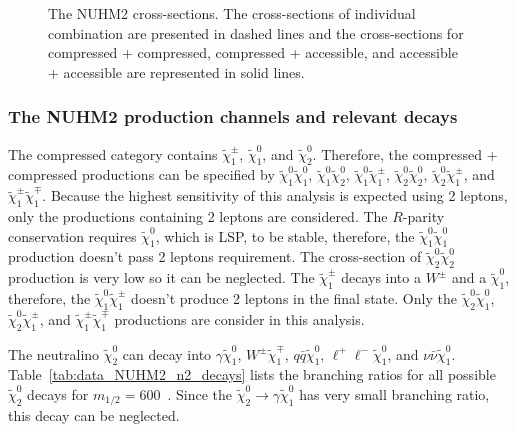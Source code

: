 \begin{figure}[htbp]
    \begin{center}
        \caption{The NUHM2 cross-sections.
        The cross-sections of individual combination are presented in dashed lines and the cross-sections for compressed + compressed, compressed + accessible, and accessible + accessible are represented in solid lines.}
        \label{fig:data_NUHM2_cross_sections}
    \end{center}
\end{figure}


\subsubsection{The NUHM2 production channels and relevant decays}
\label{subsubsec:data_channels_and_decays}
The compressed category contains $\widetilde{\chi}^{\pm}_{1}$, $\widetilde{\chi}^{0}_{1}$, and $\widetilde{\chi}^{0}_{2}$.
Therefore, the compressed + compressed productions can be specified by $\widetilde{\chi}^{0}_{1} \widetilde{\chi}^{0}_{1}$, $\widetilde{\chi}^{0}_{1} \widetilde{\chi}^{0}_{2}$, $\widetilde{\chi}^{0}_{1} \widetilde{\chi}^{\pm}_{1}$, $\widetilde{\chi}^{0}_{2} \widetilde{\chi}^{0}_{2}$, $\widetilde{\chi}^{0}_{2} \widetilde{\chi}^{\pm}_{1}$, and $\widetilde{\chi}^{\pm}_{1} \widetilde{\chi}^{\mp}_{1}$.
Because the highest sensitivity of this analysis is expected using 2 leptons, only the productions containing 2 leptons are considered.
The $R$-parity conservation requires $\widetilde{\chi}^{0}_{1}$, which is LSP, to be stable, therefore, the $\widetilde{\chi}^{0}_{1} \widetilde{\chi}^{0}_{1}$ production doesn't pass 2 leptons requirement.
The cross-section of $\widetilde{\chi}^{0}_{2} \widetilde{\chi}^{0}_{2}$ production is very low so it can be neglected.
The $\widetilde{\chi}^{\pm}_{1}$ decays into a $W^{\pm}$ and a $\widetilde{\chi}^{0}_{1}$, therefore, the $\widetilde{\chi}^{0}_{1} \widetilde{\chi}^{\pm}_{1}$ doesn't produce 2 leptons in the final state.
Only the $\widetilde{\chi}^{0}_{2} \widetilde{\chi}^{0}_{1}$, $\widetilde{\chi}^{0}_{2} \widetilde{\chi}^{\pm}_{1}$, and $\widetilde{\chi}^{\pm}_{1} \widetilde{\chi}^{\mp}_{1}$ productions are consider in this analysis.

The neutralino $\widetilde{\chi}^{0}_{2}$ can decay into $\gamma \widetilde{\chi}^{0}_{1}$, $W^{\pm} \widetilde{\chi}^{\mp}_{1}$, $q\bar{q} \widetilde{\chi}^{0}_{1}$, $\ell^{+}\ell^{-} \widetilde{\chi}^{0}_{1}$, and $\nu\bar{\nu} \widetilde{\chi}^{0}_{1}$.
Table~\ref{tab:data_NUHM2_n2_decays} lists the branching ratios for all possible $\widetilde{\chi}^{0}_{2}$ decays for $m_{1/2} = 600$~{\GeV}.
Since the $\widetilde{\chi}^{0}_{2} \to \gamma \widetilde{\chi}^{0}_{1}$ has very small branching ratio, this decay can be neglected.

